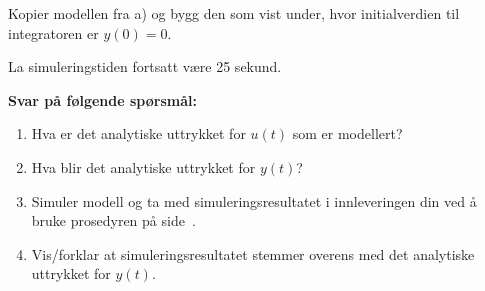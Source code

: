 
\item
  Kopier modellen fra a) og bygg den som vist under, hvor initialverdien til integratoren er $y(0){=}0$.
  \begin{figure}[H]
    \centering
    \hspace*{0mm}
  \end{figure}
  
  {\color{red}La simuleringstiden fortsatt være 25 sekund.}

    {\bf Svar på følgende spørsmål:    }

  \begin{enumerate}[label=c\arabic*)]
    \item   Hva er det analytiske uttrykket for $u(t)$ som er modellert?
    \item Hva blir det analytiske uttrykket for $y(t)$?
    \item Simuler modell og ta med simuleringsresultatet i
      innleveringen din ved å bruke prosedyren på
     side~\pageref{page:prosedyre}.

\item Vis/forklar at simuleringsresultatet  stemmer
  overens med  det analytiske uttrykket for $y(t)$. 
  
  \end{enumerate}
